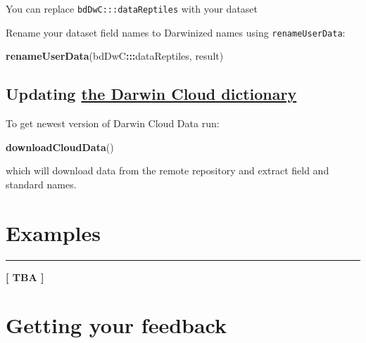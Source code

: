 \documentclass[]{book}
\newenvironment{Shaded}{\begin{snugshade}}{\end{snugshade}}
\newcommand{\KeywordTok}[1]{\textcolor[rgb]{0.13,0.29,0.53}{\textbf{#1}}}
\newcommand{\DataTypeTok}[1]{\textcolor[rgb]{0.13,0.29,0.53}{#1}}
\newcommand{\StringTok}[1]{\textcolor[rgb]{0.31,0.60,0.02}{#1}}
\newcommand{\OperatorTok}[1]{\textcolor[rgb]{0.81,0.36,0.00}{\textbf{#1}}}
\newcommand{\NormalTok}[1]{#1}
\theoremstyle{definition}
\theoremstyle{definition}
\theoremstyle{definition}
\theoremstyle{remark}
\begin{document}
\begin{Shaded}
\end{Shaded}

You can replace \texttt{bdDwC:::dataReptiles} with your dataset

Rename your dataset field names to Darwinized names using
\texttt{renameUserData}:

\begin{Shaded}
\begin{Highlighting}[]
\KeywordTok{renameUserData}\NormalTok{(bdDwC}\OperatorTok{:::}\NormalTok{dataReptiles, result)}
\end{Highlighting}
\end{Shaded}

\section{\texorpdfstring{Updating
\protect\hyperlink{the-darwin-cloud-dictionary}{the Darwin Cloud
dictionary}}{Updating the Darwin Cloud dictionary}}\label{updating-the-darwin-cloud-dictionary}

To get newest version of Darwin Cloud Data run:

\begin{Shaded}
\begin{Highlighting}[]
\KeywordTok{downloadCloudData}\NormalTok{()}
\end{Highlighting}
\end{Shaded}

which will download data from the remote repository and extract field
and standard names.

\chapter{Examples}\label{examples}

\begin{center}\rule{0.5\linewidth}{\linethickness}\end{center}

\textbf{{{[} TBA {]}}}

\chapter{Getting your feedback}\label{getting-your-feedback}
\end{document}
